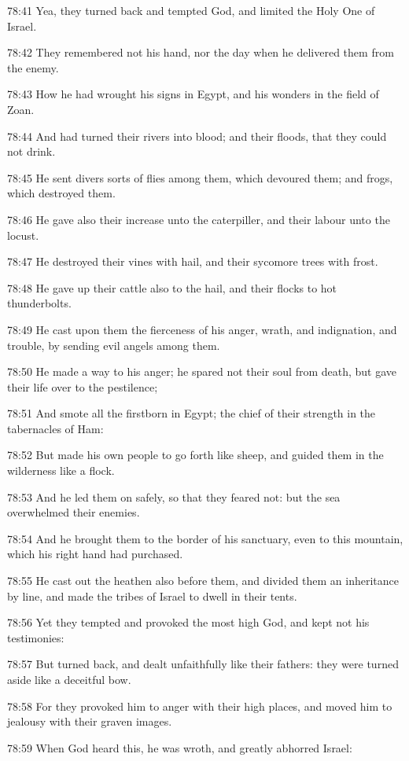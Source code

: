78:41 Yea, they turned back and tempted God, and limited the Holy One of Israel.

78:42 They remembered not his hand, nor the day when he delivered them from the enemy.

78:43 How he had wrought his signs in Egypt, and his wonders in the field of Zoan.

78:44 And had turned their rivers into blood; and their floods, that they could not drink.

78:45 He sent divers sorts of flies among them, which devoured them; and frogs, which destroyed them.

78:46 He gave also their increase unto the caterpiller, and their labour unto the locust.

78:47 He destroyed their vines with hail, and their sycomore trees with frost.

78:48 He gave up their cattle also to the hail, and their flocks to hot thunderbolts.

78:49 He cast upon them the fierceness of his anger, wrath, and indignation, and trouble, by sending evil angels among them.

78:50 He made a way to his anger; he spared not their soul from death, but gave their life over to the pestilence;

78:51 And smote all the firstborn in Egypt; the chief of their strength in the tabernacles of Ham:

78:52 But made his own people to go forth like sheep, and guided them in the wilderness like a flock.

78:53 And he led them on safely, so that they feared not: but the sea overwhelmed their enemies.

78:54 And he brought them to the border of his sanctuary, even to this mountain, which his right hand had purchased.

78:55 He cast out the heathen also before them, and divided them an inheritance by line, and made the tribes of Israel to dwell in their tents.

78:56 Yet they tempted and provoked the most high God, and kept not his testimonies:

78:57 But turned back, and dealt unfaithfully like their fathers: they were turned aside like a deceitful bow.

78:58 For they provoked him to anger with their high places, and moved him to jealousy with their graven images.

78:59 When God heard this, he was wroth, and greatly abhorred Israel:

